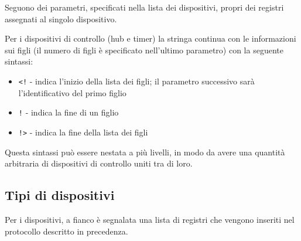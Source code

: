 \documentclass[11pt]{article}
\begin{document}
Seguono dei parametri, specificati nella lista dei dispositivi, propri dei registri assegnati al singolo dispositivo.

Per i dispositivi di controllo (hub e timer) la stringa continua con le informazioni sui figli (il numero di figli è specificato nell'ultimo parametro) con la seguente sintassi:

\begin{itemize}
    \item \verb|<!| - indica l'inizio della lista dei figli; il parametro successivo sarà l'identificativo del primo figlio
    \item \verb|!| - indica la fine di un figlio
    \item \verb|!>| - indica la fine della lista dei figli
\end{itemize}

Questa sintassi può essere nestata a più livelli, in modo da avere una quantità arbitraria di dispositivi di controllo uniti tra di loro.

\subsection{Tipi di dispositivi}

Per i dispositivi, a fianco è segnalata una lista di registri che vengono inseriti nel protocollo descritto in precedenza.
\end{document}
